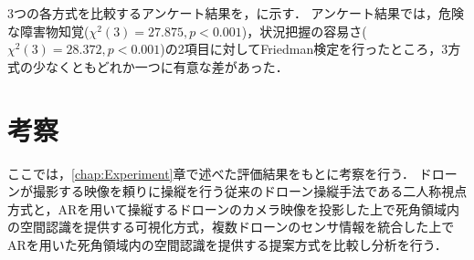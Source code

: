 \documentclass[a4paper,11pt]{ujreport}
\begin{document}
3つの各方式を比較するアンケート結果を，に示す．
アンケート結果では，危険な障害物知覚($\chi^{2}(3)=27.875, p < 0.001$)，状況把握の容易さ($\chi^{2}(3)=28.372, p < 0.001$)の2項目に対してFriedman検定を行ったところ，3方式の少なくともどれか一つに有意な差があった．


\chapter{考察}
\label{chap:Discussion}

ここでは，\ref{chap:Experiment}章で述べた評価結果をもとに考察を行う．
ドローンが撮影する映像を頼りに操縦を行う従来のドローン操縦手法である二人称視点方式と，ARを用いて操縦するドローンのカメラ映像を投影した上で死角領域内の空間認識を提供する可視化方式，複数ドローンのセンサ情報を統合した上でARを用いた死角領域内の空間認識を提供する提案方式を比較し分析を行う．
\end{document}
